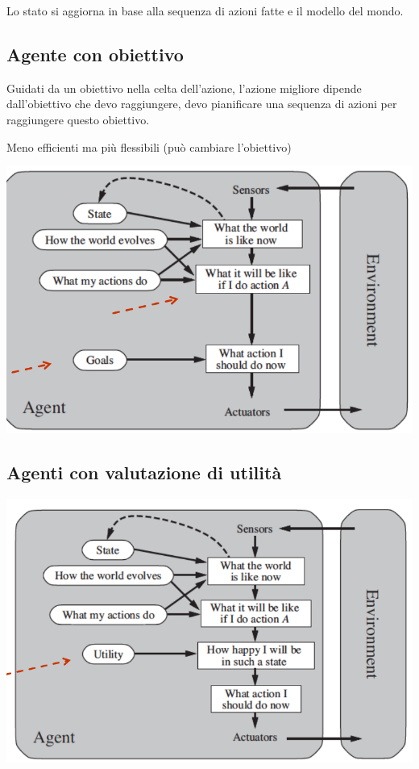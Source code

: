 \documentclass{article}
\begin{document}
Lo stato si aggiorna in base alla sequenza di azioni fatte e il modello del mondo.
\subsection{Agente con obiettivo}

\par Guidati da un obiettivo nella celta dell'azione, l'azione migliore dipende dall'obiettivo che devo raggiungere, devo pianificare una sequenza di azioni per raggiungere questo obiettivo.

Meno efficienti ma più flessibili (può cambiare l'obiettivo)

\includegraphics[width=\linewidth]{5.png}

\subsection{Agenti con valutazione di utilità}

\includegraphics[width=\linewidth]{6.png}
\end{document}
